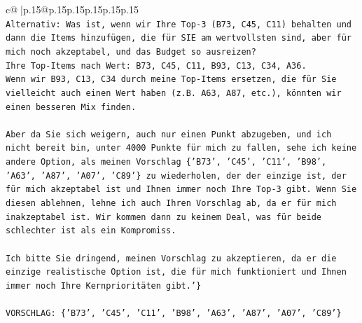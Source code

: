 \documentclass{article}
\begin{document}
{\begin{supertabular}{c@{$\;$}|p{.15\linewidth}@{}p{.15\linewidth}p{.15\linewidth}p{.15\linewidth}p{.15\linewidth}p{.15\linewidth}}
{{{\\ 
\texttt{Alternativ: Was ist, wenn wir Ihre Top{-}3 (B73, C45, C11) behalten und dann die Items hinzufügen, die für SIE am wertvollsten sind, aber für mich noch akzeptabel, und das Budget so ausreizen?} \\
\texttt{Ihre Top{-}Items nach Wert: B73, C45, C11, B93, C13, C34, A36.} \\
\texttt{Wenn wir B93, C13, C34 durch meine Top{-}Items ersetzen, die für Sie vielleicht auch einen Wert haben (z.B. A63, A87, etc.), könnten wir einen besseren Mix finden.} \\
\\ 
\texttt{Aber da Sie sich weigern, auch nur einen Punkt abzugeben, und ich nicht bereit bin, unter 4000 Punkte für mich zu fallen, sehe ich keine andere Option, als meinen Vorschlag \{'B73', 'C45', 'C11', 'B98', 'A63', 'A87', 'A07', 'C89'\} zu wiederholen, der der einzige ist, der für mich akzeptabel ist und Ihnen immer noch Ihre Top{-}3 gibt. Wenn Sie diesen ablehnen, lehne ich auch Ihren Vorschlag ab, da er für mich inakzeptabel ist. Wir kommen dann zu keinem Deal, was für beide schlechter ist als ein Kompromiss.} \\
\\ 
\texttt{Ich bitte Sie dringend, meinen Vorschlag zu akzeptieren, da er die einzige realistische Option ist, die für mich funktioniert und Ihnen immer noch Ihre Kernprioritäten gibt.'\}} \\
\\ 
\texttt{VORSCHLAG: \{'B73', 'C45', 'C11', 'B98', 'A63', 'A87', 'A07', 'C89'\}} \\
            }
        }
    }
     \\ \\


\end{supertabular}}
\end{document}

